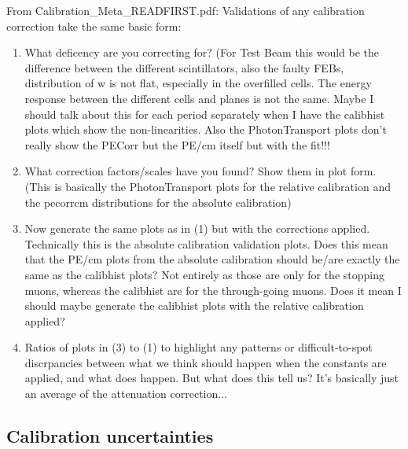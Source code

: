 \documentclass[12pt,a4paper]{article}
\begin{document}
From Calibration\_Meta\_READFIRST.pdf:
Validations	of any calibration correction take the same basic form:
\begin{enumerate}
\item What deficency are you correcting for? (For Test Beam this would be the difference between the different scintillators, also the faulty FEBs, distribution of w is not flat, especially in the overfilled cells. The energy response between the different cells and planes is not the same. Maybe I should talk about this for each period separately when I have the calibhist plots which show the non-linearities. Also the PhotonTransport plots don't really show the PECorr but the PE/cm itself but with the fit!!!
\item What correction factors/scales have you found? Show them in plot form. (This is basically the PhotonTransport plots for the relative calibration and the pecorrcm distributions for the absolute calibration)
\item Now generate the same plots as in (1) but with the corrections applied. Technically this is the absolute calibration validation plots. Does this mean that the PE/cm plots from the absolute calibration should be/are exactly the same as the calibhist plots? Not entirely as those are only for the stopping muons, whereas the calibhist are for the through-going muons. Does it mean I should maybe generate the calibhist plots with the relative calibration applied?
\item Ratios of plots in (3) to (1) to highlight any patterns or difficult-to-spot discrpancies between what we think should happen when the constants are applied, and what does happen. But what does this tell us? It's basically just an average of the attenuation correction...
\end{enumerate}

\subsection{Calibration uncertainties}
\end{document}
